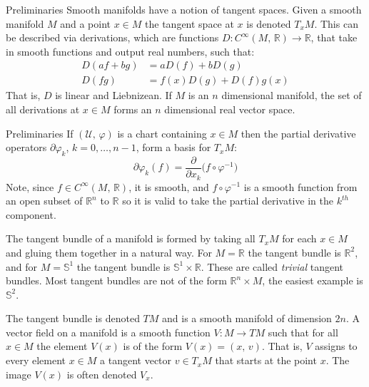 \documentclass{beamer}
\begin{document}
    \begin{frame}{Preliminaries}
        Smooth manifolds have a notion of tangent spaces. Given a smooth
        manifold $M$ and a point $x\in{M}$ the tangent space at $x$ is
        denoted $T_{x}M$. This can be described via derivations, which are
        functions $D:C^{\infty}(M,\,\mathbb{R})\rightarrow\mathbb{R}$, that take
        in smooth functions and output real numbers, such that:
        \begin{align}
            D(af+bg)&=aD(f)+bD(g)\\
            D(fg)&=f(x)D(g)+D(f)g(x)
        \end{align}
        That is, $D$ is linear and Liebnizean. If $M$ is an $n$ dimensional
        manifold, the set of all derivations at $x\in{M}$ forms an $n$
        dimensional real vector space.
    \end{frame}
    \begin{frame}{Preliminaries}
        If $(\mathcal{U},\,\varphi)$ is a chart containing $x\in{M}$ then the
        partial derivative operators $\partial\varphi_{k}$, $k=0,\dots,n-1$,
        form a basis for $T_{x}M$:
        \begin{equation}
            \partial\varphi_{k}(f)
            =\frac{\partial}{\partial{x}_{k}}\Big(f\circ\varphi^{-1}\Big)
        \end{equation}
        Note, since $f\in{C}^{\infty}(M,\,\mathbb{R})$, it is smooth, and
        $f\circ\varphi^{-1}$ is a smooth function from an open subset of
        $\mathbb{R}^{n}$ to $\mathbb{R}$ so it is valid to take the partial
        derivative in the $k^{th}$ component.
    \end{frame}
    \begin{frame}
        The tangent bundle of a manifold is formed by taking all $T_{x}M$ for
        each $x\in{M}$ and gluing them together in a natural way. For
        $M=\mathbb{R}$ the tangent bundle is $\mathbb{R}^{2}$, and for
        $M=\mathbb{S}^{1}$ the tangent bundle is
        $\mathbb{S}^{1}\times\mathbb{R}$. These are called \textit{trivial}
        tangent bundles. Most tangent bundles are not of the form
        $\mathbb{R}^{n}\times{M}$, the easiest example is $\mathbb{S}^{2}$.
        \par\hfill\par
        The tangent bundle is denoted $TM$ and is a smooth manifold of dimension
        $2n$. A vector field on a manifold is a smooth function
        $V:M\rightarrow{T}M$ such that for all $x\in{M}$ the element
        $V(x)$ is of the form $V(x)=(x,\,v)$. That is, $V$ assigns to every
        element $x\in{M}$ a tangent vector $v\in{T}_{x}M$ that starts at the
        point $x$. The image $V(x)$ is often denoted $V_{x}$.
    \end{frame}
\end{document}
